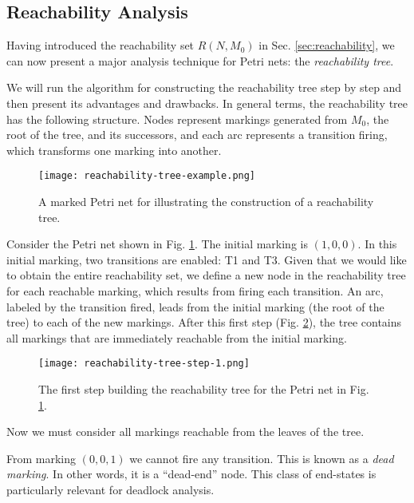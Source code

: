 \subsection{Reachability Analysis}

Having introduced the reachability set $R(N, M_0)$ in Sec. \ref{sec:reachability},
we can now present a major analysis technique for Petri nets: the \emph{reachability tree}.

We will run the algorithm for constructing the reachability tree step by step
and then present its advantages and drawbacks.
In general terms, the reachability tree has the following structure.
Nodes represent markings generated from $M_0$, the root of the tree, and its successors,
and each arc represents a transition firing, which transforms one marking into another.

\begin{figure}
    \centering
    \texttt{[image: reachability-tree-example.png]}
    \caption{A marked Petri net for illustrating the construction of a reachability tree.}
    \label{fig:reachability-tree-example}
\end{figure}

Consider the Petri net shown in Fig. \ref{fig:reachability-tree-example}.
The initial marking is $(1, 0, 0)$.
In this initial marking, two transitions are enabled: T1 and T3.
Given that we would like to obtain the entire reachability set,
we define a new node in the reachability tree for each reachable marking,
which results from firing each transition.
An arc, labeled by the transition fired, leads from the initial marking
(the root of the tree) to each of the new markings.
After this first step (Fig. \ref{fig:reachability-tree-step-1}), the tree contains all markings
that are immediately reachable from the initial marking.

\begin{figure}
    \centering
    \texttt{[image: reachability-tree-step-1.png]}
    \caption{The first step building the reachability tree
        for the Petri net in Fig. \ref{fig:reachability-tree-example}.}
    \label{fig:reachability-tree-step-1}
\end{figure}

Now we must consider all markings reachable from the leaves of the tree.

From marking $(0,0,1)$ we cannot fire any transition.
This is known as a \emph{dead marking}.
In other words, it is a ``dead-end'' node.
This class of end-states is particularly relevant for deadlock analysis.


